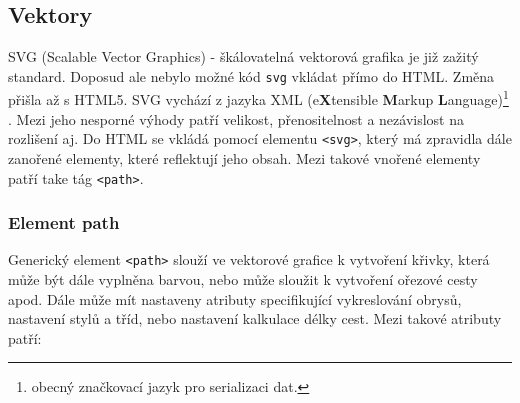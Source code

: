 \subsection{Vektory}
SVG (Scalable Vector Graphics) - škálovatelná vektorová grafika je již zažitý standard. Doposud ale nebylo možné kód \texttt{svg} vkládat přímo do HTML. Změna přišla až s HTML5. SVG vychází z jazyka XML (e\textbf{X}tensible \textbf{M}arkup \textbf{L}anguage)\footnote{obecný značkovací jazyk pro serializaci dat.} \cite{HTML5aCSS3}.  Mezi jeho nesporné výhody patří velikost, přenositelnost a nezávislost na rozlišení aj. Do HTML se vkládá pomocí elementu \texttt{<svg>}, který má zpravidla dále zanořené elementy, které reflektují jeho obsah. Mezi takové vnořené elementy patří take tág \texttt{<path>}.


\subsubsection{Element path}
Generický element \texttt{<path>} slouží ve vektorové grafice k vytvoření křivky, která může být dále vyplněna barvou, nebo může sloužit k vytvoření ořezové cesty apod. Dále může mít nastaveny atributy specifikující vykreslování obrysů, nastavení stylů a tříd, nebo nastavení kalkulace délky cest. Mezi takové atributy patří:

